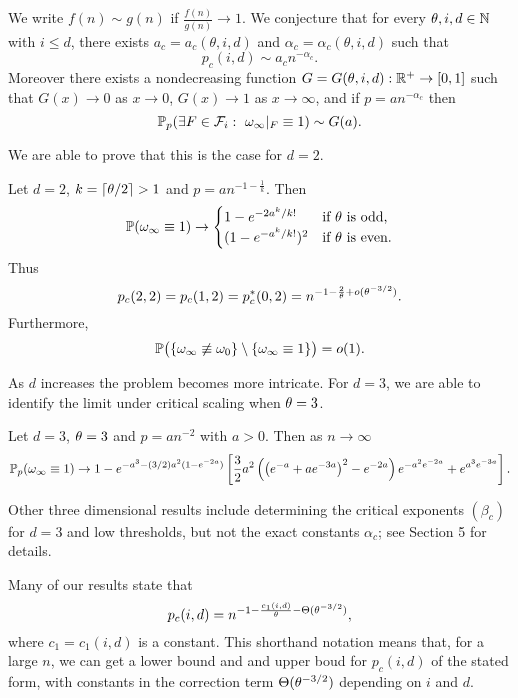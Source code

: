 We write $f(n)\sim g(n)$ if $\frac{f(n)}{g(n)}  \to 1.$ 
We conjecture that for every $\theta, i, d \in \mathbb{N}$ with $i \leq d$, there exists $a_c=a_c(\theta,i,d)$ and $\alpha_c=\alpha_c(\theta,i,d)$
such that
$$p_c(i,d) \sim a_cn^{-\alpha_c}.$$
Moreover there exists a nondecreasing function $G=G(\theta,i,d):\mathbb{R}^+ \to [0,1]$ such that
$G(x) \to 0$ as $x \to 0$, 
$G(x) \to 1$ as $x \to \infty$, and if $p=a n^{-\alpha_c}$ then
$$\mathbb{P}_{p}(\exists F \in \mathcal F_i:\  \omega_\infty|_F\equiv1) \sim G(a).$$

We are able to prove that this is the case for $d=2$.
\begin{theorem}
\label{2d-thm}
Let $d=2$, $k = \lceil \theta/2 \rceil > 1$ and $p=an^{-1-\frac{1}{k}}$. 
Then
$$
\mathbb{P}( \omega_\infty\equiv 1) \to
\begin{cases}
1-e^{-2a^k/k!}& \text{if $\theta$ is odd,}
\\
(1-e^{-a^k/k!})^2 &\text{if $\theta$ is even.}
\end{cases}
$$
Thus
$$p_c(2,2)=p_c(1,2)=p^*_c(0,2)=n^{-1-\frac{2}{\theta} + o(\theta^{-3/2})}.$$
Furthermore,
$$\mathbb{P}\big(\{\omega_\infty \not\equiv \omega_0\} \setminus \{\omega_\infty\equiv 1\}\big)=o(1).$$
\end{theorem}

As $d$ increases the problem becomes more intricate. For $d=3$, we are able to identify the limit under critical scaling when 
$\theta=3$. 

\begin{theorem}
\label{3d-spanning-thm}
Let $d=3$, $\theta=3$ and $p = an^{-2}$ with $a>0$.  Then as $n\to \infty$
\begin{equation}
\mathbb{P}_{p}(\omega_\infty \equiv 1) \to 1 - e^{-a^3 - (3/2)a^2(1-e^{-2a})}\left[\frac{3}{2} a^2\left(\left(e^{-a}+ae^{-3a}\right)^2-e^{-2a}\right)e^{-a^2e^{-2a}} + e^{a^3e^{-3a}} \right].
\end{equation}
\end{theorem}

Other three dimensional results include 
determining the critical exponents $(\beta_c)$ for $d=3$ and low thresholds, but not the exact constants $\alpha_c$; 
see Section 5 for details. 

Many of our results state that
$$p_c(i,d)=n^{-1 - \frac{c_1(i,d)}{\theta} - \Theta(\theta^{-3/2})},$$
where $c_1=c_1(i,d)$ is a constant. This shorthand notation means that, for a large 
$n$, we can get a lower bound and and upper boud for $p_c(i,d)$ of the stated form, 
with constants in the correction term $\Theta(\theta^{-3/2})$ depending on $i$ and $d$.



